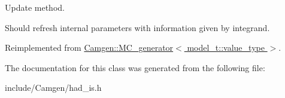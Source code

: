 Update method. 

Should refresh internal parameters with information given by integrand. 

Reimplemented from \hyperlink{a00362_ae5e70cee65aacbb6a556057de02ef3dd}{Camgen\-::\-M\-C\-\_\-generator$<$ model\-\_\-t\-::value\-\_\-type $>$}.



The documentation for this class was generated from the following file\-:\begin{DoxyCompactItemize}
\item 
include/\-Camgen/had\-\_\-is.\-h\end{DoxyCompactItemize}
